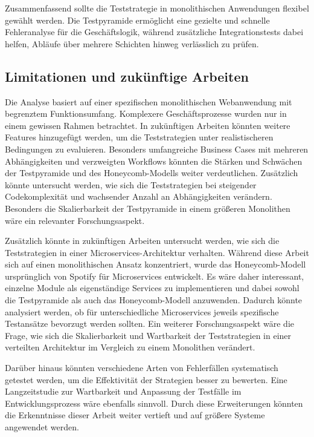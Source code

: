 Zusammenfassend sollte die Teststrategie in monolithischen Anwendungen flexibel gewählt werden. Die Testpyramide ermöglicht eine gezielte und schnelle Fehleranalyse für die Geschäftslogik, während zusätzliche Integrationstests dabei helfen, Abläufe über mehrere Schichten hinweg verlässlich zu prüfen.


\subsection{Limitationen und zukünftige Arbeiten}
Die Analyse basiert auf einer spezifischen monolithischen Webanwendung mit begrenztem Funktionsumfang. Komplexere Geschäftsprozesse wurden nur in einem gewissen Rahmen betrachtet. In zukünftigen Arbeiten könnten weitere Features hinzugefügt werden, um die Teststrategien unter realistischeren Bedingungen zu evaluieren. Besonders umfangreiche Business Cases mit mehreren Abhängigkeiten und verzweigten Workflows könnten die Stärken und Schwächen der Testpyramide und des Honeycomb-Modells weiter verdeutlichen. Zusätzlich könnte untersucht werden, wie sich die Teststrategien bei steigender Codekomplexität und wachsender Anzahl an Abhängigkeiten verändern. Besonders die Skalierbarkeit der Testpyramide in einem größeren Monolithen wäre ein relevanter Forschungsaspekt.

Zusätzlich könnte in zukünftigen Arbeiten untersucht werden, wie sich die Teststrategien in einer Microservices-Architektur verhalten. Während diese Arbeit sich auf einen monolithischen Ansatz konzentriert, wurde das Honeycomb-Modell ursprünglich von Spotify für Microservices entwickelt. Es wäre daher interessant, einzelne Module als eigenständige Services zu implementieren und dabei sowohl die Testpyramide als auch das Honeycomb-Modell anzuwenden. Dadurch könnte analysiert werden, ob für unterschiedliche Microservices jeweils spezifische Testansätze bevorzugt werden sollten. Ein weiterer Forschungsaspekt wäre die Frage, wie sich die Skalierbarkeit und Wartbarkeit der Teststrategien in einer verteilten Architektur im Vergleich zu einem Monolithen verändert.

Darüber hinaus könnten verschiedene Arten von Fehlerfällen systematisch getestet werden, um die Effektivität der Strategien besser zu bewerten. Eine Langzeitstudie zur Wartbarkeit und Anpassung der Testfälle im Entwicklungsprozess wäre ebenfalls sinnvoll. Durch diese Erweiterungen könnten die Erkenntnisse dieser Arbeit weiter vertieft und auf größere Systeme angewendet werden.
